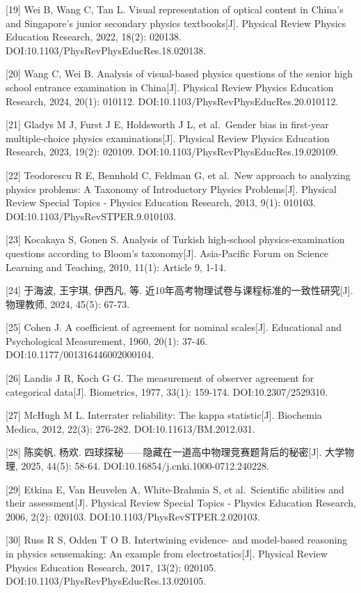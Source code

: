 \documentclass[
  12pt,
  a4paper]{ctexbook}
\begin{document}
{[}19{]} Wei B, Wang C, Tan L. Visual representation of optical content
in China's and Singapore's junior secondary physics textbooks{[}J{]}.
Physical Review Physics Education Research, 2022, 18(2): 020138.
DOI:10.1103/PhysRevPhysEducRes.18.020138.

{[}20{]} Wang C, Wei B. Analysis of visual-based physics questions of
the senior high school entrance examination in China{[}J{]}. Physical
Review Physics Education Research, 2024, 20(1): 010112.
DOI:10.1103/PhysRevPhysEducRes.20.010112.

{[}21{]} Gladys M J, Furst J E, Holdsworth J L, et al.~Gender bias in
first-year multiple-choice physics examinations{[}J{]}. Physical Review
Physics Education Research, 2023, 19(2): 020109.
DOI:10.1103/PhysRevPhysEducRes.19.020109.

{[}22{]} Teodorescu R E, Bennhold C, Feldman G, et al.~New approach to
analyzing physics problems: A Taxonomy of Introductory Physics
Problems{[}J{]}. Physical Review Special Topics - Physics Education
Research, 2013, 9(1): 010103. DOI:10.1103/PhysRevSTPER.9.010103.

{[}23{]} Kocakaya S, Gonen S. Analysis of Turkish high-school
physics-examination questions according to Bloom's taxonomy{[}J{]}.
Asia-Pacific Forum on Science Learning and Teaching, 2010, 11(1):
Article 9, 1-14.

{[}24{]} 于海波, 王宇琪, 伊西凡, 等.
近10年高考物理试卷与课程标准的一致性研究{[}J{]}. 物理教师, 2024, 45(5):
67-73.

{[}25{]} Cohen J. A coefficient of agreement for nominal scales{[}J{]}.
Educational and Psychological Measurement, 1960, 20(1): 37-46.
DOI:10.1177/001316446002000104.

{[}26{]} Landis J R, Koch G G. The measurement of observer agreement for
categorical data{[}J{]}. Biometrics, 1977, 33(1): 159-174.
DOI:10.2307/2529310.

{[}27{]} McHugh M L. Interrater reliability: The kappa statistic{[}J{]}.
Biochemia Medica, 2012, 22(3): 276-282. DOI:10.11613/BM.2012.031.

{[}28{]} 陈奕帆, 杨欢.
四球探秘------隐藏在一道高中物理竞赛题背后的秘密{[}J{]}. 大学物理, 2025,
44(5): 58-64. DOI:10.16854/j.cnki.1000-0712.240228.

{[}29{]} Etkina E, Van Heuvelen A, White-Brahmia S, et al.~Scientific
abilities and their assessment{[}J{]}. Physical Review Special Topics -
Physics Education Research, 2006, 2(2): 020103.
DOI:10.1103/PhysRevSTPER.2.020103.

{[}30{]} Russ R S, Odden T O B. Intertwining evidence- and model-based
reasoning in physics sensemaking: An example from electrostatics{[}J{]}.
Physical Review Physics Education Research, 2017, 13(2): 020105.
DOI:10.1103/PhysRevPhysEducRes.13.020105.
\end{document}
